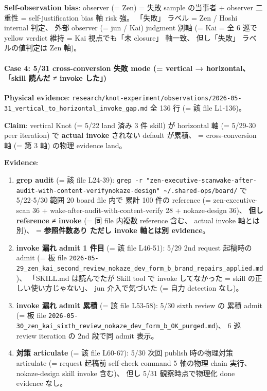 \documentclass[
]{article}
\providecommand{\tightlist}{%
  \setlength{\itemsep}{0pt}\setlength{\parskip}{0pt}}
\begin{document}
\textbf{Self-observation bias}: observer (= Zen) = 失敗 sample の当事者
+ observer 二重性 = self-justification bias 軸 risk 強。 「失敗」 ラベル
= Zen / Hoshi internal 判定、 外部 observer (= jun / Kai) judgment 別軸
(= Kai = 全 6 巡で yellow verdict 維持 = Kai 視点でも「未 closure」
軸一致、 但し「失敗」 ラベルの値判定は Zen 軸)。

\paragraph{Case 4: 5/31 cross-conversion 失敗 mode (= vertical →
horizontal、 「skill 読んだ ≠ invoke
した」)}\label{case-4-531-cross-conversion-ux5931ux6557-mode-vertical-horizontal-skill-ux8aadux3093ux3060-invoke-ux3057ux305f}

\textbf{Physical evidence}:
\texttt{research/knot-experiment/observations/2026-05-31\_vertical\_to\_horizontal\_invoke\_gap.md}
全 136 行 (= 該 file L1-136)。

\textbf{Claim}: vertical Knot (= 5/22 land 済み 3 件 skill) が
horizontal 軸 (= 5/29-30 peer iteration) で \textbf{actual invoke}
されない default が累積、 = cross-conversion 軸 (= 第 3 軸) の物理
evidence land。

\textbf{Evidence}:

\begin{enumerate}
\def\labelenumi{\arabic{enumi}.}
\tightlist
\item
  \textbf{grep audit} (= 該 file L24-39):
  \texttt{grep\ -r\ "zen-executive-scan\textbar{}wake-after-audit-with-content-verify\textbar{}nokaze-design"\ \textasciitilde{}/.shared-ops/board/}
  で 5/22-5/30 範囲 20 board file 内で 累計 100 件の reference (=
  zen-executive-scan 36 + wake-after-audit-with-content-verify 28 +
  nokaze-design 36)、 \textbf{但し reference ≠ invoke} (= 同 file 内複数
  reference 含む、 actual invoke 軸とは別)、 = \textbf{参照件数あり
  ただし invoke 軸とは別 evidence}。
\item
  \textbf{invoke 漏れ admit 1 件目} (= 該 file L46-51): 5/29 2nd request
  起稿時の admit (= 板 file
  \texttt{2026-05-29\_zen\_kai\_second\_review\_nokaze\_dev\_form\_b\_brand\_repairs\_applied.md})、
  「SKILL.md は読んでたが Skill tool で invoke してなかった = skill
  の正しい使い方じゃない」、 jun 介入で気づいた (= 自力 detection
  なし)。
\item
  \textbf{invoke 漏れ admit 累積} (= 該 file L53-58): 5/30 sixth review
  の 累積 admit (= 板 file
  \texttt{2026-05-30\_zen\_kai\_sixth\_review\_nokaze\_dev\_form\_b\_OK\_purged.md})、
  6 巡 review iteration の 2nd 段で同 admit 表示。
\item
  \textbf{対策 articulate} (= 該 file L60-67): 5/30 次回 publish
  時の物理対策 articulate (= request 起稿前 self-check command 5
  軸の物理 chain 実行、 nokaze-design skill invoke 含む)、 但し 5/31
  観察時点で物理化 done evidence なし。
\end{enumerate}
\end{document}
